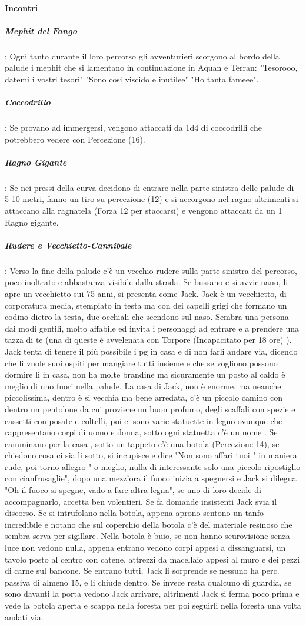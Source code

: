 \documentclass{article}
\begin{document}
\paragraph{Incontri}
\subparagraph{Mephit del Fango}: Ogni tanto durante il loro percorso gli avventurieri scorgono al bordo della palude i mephit che si lamentano in continuazione in Aquan e Terran:  "Tesorooo, datemi i vostri tesori" "Sono cosi viscido e inutilee" "Ho tanta fameee".
\subparagraph{Coccodrillo}: Se provano ad immergersi, vengono attaccati da 1d4 di coccodrilli che potrebbero vedere con Percezione (16).
\subparagraph{Ragno Gigante}: Se nei pressi della curva decidono di entrare nella parte sinistra delle palude di 5-10 metri, fanno un tiro su percezione (12) e si accorgono nel ragno altrimenti si attaccano alla ragnatela (Forza 12 per staccarsi) e vengono attaccati da un 1 Ragno gigante. 
\subparagraph{Rudere e Vecchietto-Cannibale}: Verso la fine della palude c'è un vecchio rudere sulla parte sinistra del percorso, poco inoltrato e abbastanza visibile dalla strada. Se bussano e si avvicinano, li apre un vecchietto sui 75 anni, si presenta come Jack. Jack è un vecchietto, di corporatura media, stempiato in testa ma con dei capelli grigi che formano un codino dietro la testa, due occhiali che scendono sul naso. Sembra una persona dai modi gentili, molto affabile ed invita i personaggi ad entrare e a prendere una tazza di te (una di queste è avvelenata con Torpore (Incapacitato per 18 ore) ). Jack tenta di tenere il più possibile i pg in casa e di non farli andare via, dicendo che li vuole suoi ospiti per mangiare tutti insieme e che se vogliono possono dormire li in casa, non ha molte brandine ma sicuramente un posto al caldo è meglio di uno fuori nella palude.
La casa di Jack, non è enorme, ma neanche piccolissima, dentro è si vecchia ma bene arredata, c'è un piccolo camino con dentro un pentolone da cui proviene un buon profumo, degli scaffali con spezie e cassetti con posate e coltelli, poi ci sono varie statuette in legno ovunque che rappresentano corpi di uomo e donna, sotto ogni statuetta c'è un nome . Se camminano per la casa , sotto un tappeto c'è una botola (Percezione 14), se chiedono cosa ci sia li sotto, si incupisce e dice "Non sono affari tuoi " in maniera rude, poi torno allegro " o meglio, nulla di interessante solo una piccolo ripostiglio con cianfrusaglie", dopo una mezz'ora il fuoco inizia a spegnersi e Jack si dilegua "Oh il fuoco si spegne, vado a fare altra legna", se uno di loro decide di accompagnarlo, accetta ben volentieri. Se fa domande insistenti Jack svia il discorso. Se si intrufolano nella botola, appena aprono sentono un tanfo incredibile e notano che sul coperchio della botola c'è del materiale resinoso che sembra serva per sigillare. Nella botola è buio, se non hanno scurovisione senza luce non vedono nulla, appena entrano vedono corpi appesi a dissanguarsi, un tavolo posto al centro con catene, attrezzi da macellaio appesi al muro e dei pezzi di carne sul bancone. Se entrano tutti, Jack li sorprende se nessuno ha perc. passiva di almeno 15, e li chiude dentro. Se invece resta qualcuno di guardia, se sono davanti la porta vedono Jack arrivare, altrimenti Jack si ferma poco prima e vede la botola aperta e scappa nella foresta per poi seguirli nella foresta una volta andati via.   
   
\end{document}
